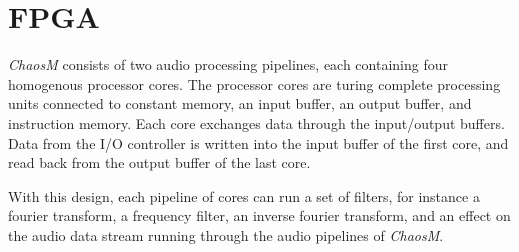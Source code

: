 \FloatBarrier
\section{FPGA}\label{chapter:fpga}

\textit{ChaosM} consists of two audio processing pipelines, each containing four
homogenous processor cores. The processor cores are turing complete processing
units connected to constant memory, an input buffer, an output buffer, and
instruction memory. Each core exchanges data through the input/output buffers.
Data from the I/O controller is written into the input buffer of the first core, and read
back from the output buffer of the last core.

With this design, each pipeline of cores can run a set of filters, for instance
a fourier transform, a frequency filter, an inverse fourier transform, and an
effect on the audio data stream running through the audio pipelines of \textit{ChaosM}.








